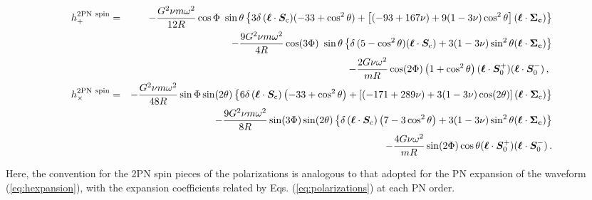 \documentclass[aps, prd,
twocolumn,%
superscriptaddress,
showpacs, nofootinbib, eqsecnum, amsmath, amssymb, floatfix
]{revtex4}
\newcommand{\bmSeffp}{{\bm{S}_{0}^+}}
\newcommand{\bmSeffm}{{\bm{S}_{0}^-}}
\begin{document}
\begin{widetext}
\begin{eqnarray}
\label{eq:hplus}
h_+^{\mathrm{2PN \ spin} }
&=&-\frac{G^2\nu m \omega^2}{12 R }\cos\Phi \ \sin\theta\left\{
3 \delta\, (\bm{\ell}\cdot \bm{S}_{\rm c})(-33+\cos ^2\theta)+
\left[(-93+167\nu)+
9(1-3\nu)\cos^2\theta\right]( \bm{\ell}\cdot \bm{\Sigma_{\rm c}})\right\}
\nonumber\\
&&-\frac{9G^2\nu m\omega^2}{4 R  }\cos (3\Phi) \ \sin\theta \left\{
\delta\,(5-\cos^2\theta)( \bm{\ell}\cdot \bm{S}_{\rm c}) +
3(1-3\nu)\sin^2\theta (\bm{\ell}\cdot \bm{\Sigma_{\rm c}})\right\}\nonumber \\
&&-\frac{2G \nu \omega^2}{m R }\cos (2\Phi)\left(1+\cos^2 \theta\right)
( \bm{\ell}\cdot \bmSeffp )(\bm{\ell}\cdot \bmSeffm )\,
,\ \\
h_\times^{\mathrm{2PN \ spin} }&=&
-\frac{G^2\nu m  \omega^2}{48 R  }\sin\Phi \sin(2\theta)\left\{
6\delta\, ( \bm{\ell}\cdot \bm{S}_{\rm c})
\left(-33+\cos^2\theta\right)+ \left[(-171+289 \nu)+
3(1-3\nu)\cos(2\theta)\right]( \bm{\ell}\cdot \bm{\Sigma}_{\rm c})\right\}
\nonumber\\
&&-\frac{9G^2\nu m \omega^2}{8 R }\sin(3\Phi)\sin(2\theta)\left\{
\delta\, ( \bm{\ell}\cdot \bm{S}_{\rm c})\left(7-3\cos^2\theta\right)+
3(1-3\nu)\sin^2\theta ( \bm{\ell} \cdot \bm{\Sigma_{\rm c}})\right\}\nonumber\\
&&-\frac{4G\nu \omega^2}{m R}\sin(2\Phi)\cos\theta
( \bm{\ell}\cdot \bmSeffp )( \bm{\ell}\cdot \bmSeffm
)\,. \label{eq:hcross}
\end{eqnarray}
\end{widetext}
Here, the convention for the 2PN spin pieces of the polarizations is analogous to that adopted for the PN expansion of the waveform  (\ref{eq:hexpansion}), with the expansion coefficients related by Eqs. (\ref{eq:polarizations}) at each PN order.
\end{document}
